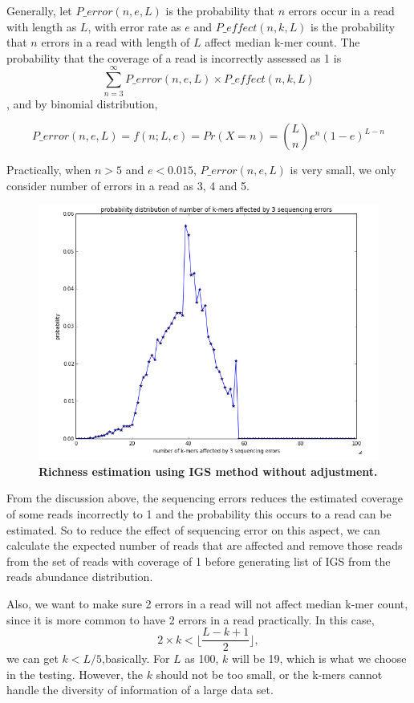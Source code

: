 \documentclass{article}
\begin{document}
Generally, let $P\_error(n,e,L)$ is the probability that $n$ errors occur in a 
read with length as $L$, with error rate as $e$ and $P\_effect(n,k,L)$ is the 
probability that $n$ 
errors in a read with length of $L$ affect median k-mer count. The probability 
that the coverage of a read is incorrectly assessed as 1 is 
\[\sum_{n=3}^{\infty} P\_error(n,e,L) \times P\_effect(n,k,L) \],
and by binomial distribution,

\[P\_error(n,e,L) = f(n;L,e) = Pr(X=n) = {L \choose n}e^n(1-e)^{L-n} \] 

Practically, when $n>5$ and $e<0.015$, $P\_error(n,e,L)$ is very small, we only consider
number of errors in a read as 3, 4 and 5.

\begin{figure}[!ht]
 \centerline{\includegraphics[width=6in]{./figures/IGS_affected_k_kmers.png}}
\caption{\bf Richness estimation using IGS method without adjustment. }
\label{fig:IGS_affected_k_kmers}
\end{figure}

From the discussion above, the sequencing errors reduces the estimated coverage of some
reads incorrectly to 1 and the probability this occurs to a read can be
estimated. So to reduce the effect of sequencing error on this aspect, we can
calculate the expected number of reads that are affected and remove those reads
from the set of reads with coverage of 1 before generating list of IGS from the
reads abundance distribution.

Also, we want to make sure 2 errors in a read will not affect median k-mer 
count, since it is more common to have 2 errors in a read practically. 
In this case, 
\[2 \times k < \lfloor \frac{L-k+1}{2}\rfloor,\]
we can get $k<L/5$,basically. For $L$ as 100, $k$ will be 19, which is what we 
choose in the testing. However, the $k$ should not be too small, or the k-mers 
cannot handle the diversity of information of a large data set.
\end{document}
